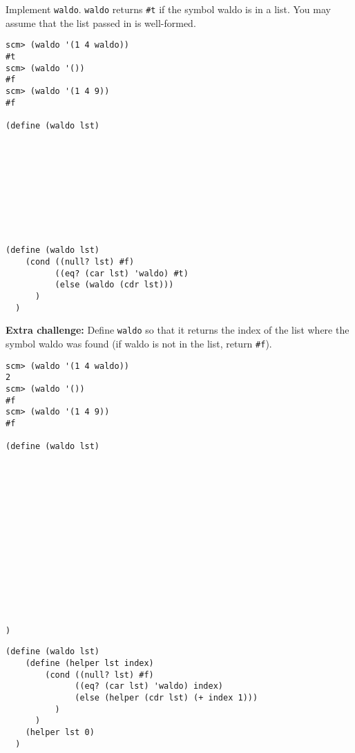 \begin{blocksection}
\question Implement \texttt{waldo}. \texttt{waldo} returns \texttt{\#t} if the
symbol waldo is in a list. You may assume that the list passed in is
well-formed.\\

\begin{lstlisting}
scm> (waldo '(1 4 waldo))
#t
scm> (waldo '())
#f
scm> (waldo '(1 4 9))
#f

(define (waldo lst)










\end{lstlisting}

\begin{solution}[0.5in]

\begin{lstlisting}
(define (waldo lst)
    (cond ((null? lst) #f)
          ((eq? (car lst) 'waldo) #t)
          (else (waldo (cdr lst)))
      )
  )
\end{lstlisting}

\end{solution}
\end{blocksection}

\begin{blocksection}

\question \textbf{Extra challenge:} Define \texttt{waldo} so that it returns the index of
the list where the symbol waldo was found (if waldo is not in the list, return
\texttt{\#f}).
\begin{lstlisting}
scm> (waldo '(1 4 waldo))
2
scm> (waldo '())
#f
scm> (waldo '(1 4 9))
#f

(define (waldo lst)















)
\end{lstlisting}

\begin{solution}[0.5in]
\begin{lstlisting}
(define (waldo lst)
    (define (helper lst index)
        (cond ((null? lst) #f)
              ((eq? (car lst) 'waldo) index)
              (else (helper (cdr lst) (+ index 1)))
          )
      )
    (helper lst 0)
  )
\end{lstlisting}
\end{solution}

\end{blocksection}
